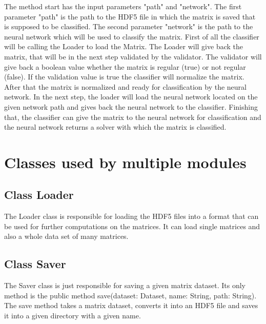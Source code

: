 \documentclass[parskip=full]{scrartcl}
\begin{document}
\begin{figure}[h]
\begin{center}

\label{Sequence Diagrams}
\end{center}
\end{figure}

\newpage
The method start has the input parameters "path" and "network".
The first parameter "path" is the path to the \gls{HDF5} file in which the matrix is saved that is supposed to be classified.
The second parameter "network" is the path to the \gls{neural network} which will be used to classify the matrix.
First of all the classifier will be calling the Loader to load the Matrix.
The Loader will give back the matrix, that will be in the next step validated by the validator. 
The validator will give back a boolean value whether the matrix is regular (true) or not regular (false).
If the validation value is true the classifier will normalize the matrix. 
After that the matrix is normalized and ready for classification by the \gls{neural network}.
In the next step, the loader will load the \gls{neural network} located on the given network path and gives back the \gls{neural network} to the classifier.
Finishing that, the classifier can give the matrix to the \gls{neural network} for classification and the \gls{neural network} returns a solver with which the matrix is classified.


\newpage
\section{Classes used by multiple modules}

\subsection{Class Loader}
The Loader class is responsible for loading the \gls{HDF5} files into a format that can be used for further computations on the matrices.
It can load single matrices and also a whole data set of many matrices.
\subsection{Class Saver}
The Saver class is just responsible for saving a given matrix dataset.
Its only method is the public method save(dataset: Dataset, name: String, path: String).
The save method takes a matrix dataset, converts it into an \gls{HDF5} file and saves it into a given directory with a given name.
\end{document}
